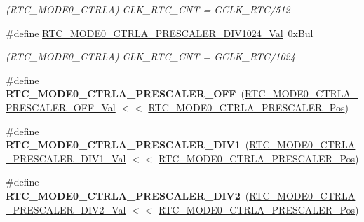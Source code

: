 \begin{DoxyCompactItemize}
\begin{DoxyCompactList}\small\item\em (R\+T\+C\+\_\+\+M\+O\+D\+E0\+\_\+\+C\+T\+R\+L\+A) C\+L\+K\+\_\+\+R\+T\+C\+\_\+\+C\+N\+T = G\+C\+L\+K\+\_\+\+R\+T\+C/512 \end{DoxyCompactList}\item 
\hypertarget{group___s_a_m_l21___r_t_c_ga831f9eaa76aec5a525d35687ba24bb89}{}\#define \hyperlink{group___s_a_m_l21___r_t_c_ga831f9eaa76aec5a525d35687ba24bb89}{R\+T\+C\+\_\+\+M\+O\+D\+E0\+\_\+\+C\+T\+R\+L\+A\+\_\+\+P\+R\+E\+S\+C\+A\+L\+E\+R\+\_\+\+D\+I\+V1024\+\_\+\+Val}~0x\+Bul\label{group___s_a_m_l21___r_t_c_ga831f9eaa76aec5a525d35687ba24bb89}

\begin{DoxyCompactList}\small\item\em (R\+T\+C\+\_\+\+M\+O\+D\+E0\+\_\+\+C\+T\+R\+L\+A) C\+L\+K\+\_\+\+R\+T\+C\+\_\+\+C\+N\+T = G\+C\+L\+K\+\_\+\+R\+T\+C/1024 \end{DoxyCompactList}\item 
\hypertarget{group___s_a_m_l21___r_t_c_gadb0491c6a31b8d45e3aa494995560813}{}\#define {\bfseries R\+T\+C\+\_\+\+M\+O\+D\+E0\+\_\+\+C\+T\+R\+L\+A\+\_\+\+P\+R\+E\+S\+C\+A\+L\+E\+R\+\_\+\+O\+F\+F}~(\hyperlink{group___s_a_m_l21___r_t_c_ga8d252b01683e5440e71ea8520409e234}{R\+T\+C\+\_\+\+M\+O\+D\+E0\+\_\+\+C\+T\+R\+L\+A\+\_\+\+P\+R\+E\+S\+C\+A\+L\+E\+R\+\_\+\+O\+F\+F\+\_\+\+Val} $<$$<$ \hyperlink{group___s_a_m_l21___r_t_c_ga0dbb76324e6c9c6d9391c96723e6e59b}{R\+T\+C\+\_\+\+M\+O\+D\+E0\+\_\+\+C\+T\+R\+L\+A\+\_\+\+P\+R\+E\+S\+C\+A\+L\+E\+R\+\_\+\+Pos})\label{group___s_a_m_l21___r_t_c_gadb0491c6a31b8d45e3aa494995560813}

\item 
\hypertarget{group___s_a_m_l21___r_t_c_gaface5f0960eb755bb01cbee0cd12a812}{}\#define {\bfseries R\+T\+C\+\_\+\+M\+O\+D\+E0\+\_\+\+C\+T\+R\+L\+A\+\_\+\+P\+R\+E\+S\+C\+A\+L\+E\+R\+\_\+\+D\+I\+V1}~(\hyperlink{group___s_a_m_l21___r_t_c_ga3368a55d0baa545619ccb1a6f1a0843a}{R\+T\+C\+\_\+\+M\+O\+D\+E0\+\_\+\+C\+T\+R\+L\+A\+\_\+\+P\+R\+E\+S\+C\+A\+L\+E\+R\+\_\+\+D\+I\+V1\+\_\+\+Val} $<$$<$ \hyperlink{group___s_a_m_l21___r_t_c_ga0dbb76324e6c9c6d9391c96723e6e59b}{R\+T\+C\+\_\+\+M\+O\+D\+E0\+\_\+\+C\+T\+R\+L\+A\+\_\+\+P\+R\+E\+S\+C\+A\+L\+E\+R\+\_\+\+Pos})\label{group___s_a_m_l21___r_t_c_gaface5f0960eb755bb01cbee0cd12a812}

\item 
\hypertarget{group___s_a_m_l21___r_t_c_ga993233478b1d65afaf5d1bf70bace8ba}{}\#define {\bfseries R\+T\+C\+\_\+\+M\+O\+D\+E0\+\_\+\+C\+T\+R\+L\+A\+\_\+\+P\+R\+E\+S\+C\+A\+L\+E\+R\+\_\+\+D\+I\+V2}~(\hyperlink{group___s_a_m_l21___r_t_c_ga114db7ddc2d209f1f98a13f185dcc0eb}{R\+T\+C\+\_\+\+M\+O\+D\+E0\+\_\+\+C\+T\+R\+L\+A\+\_\+\+P\+R\+E\+S\+C\+A\+L\+E\+R\+\_\+\+D\+I\+V2\+\_\+\+Val} $<$$<$ \hyperlink{group___s_a_m_l21___r_t_c_ga0dbb76324e6c9c6d9391c96723e6e59b}{R\+T\+C\+\_\+\+M\+O\+D\+E0\+\_\+\+C\+T\+R\+L\+A\+\_\+\+P\+R\+E\+S\+C\+A\+L\+E\+R\+\_\+\+Pos})\label{group___s_a_m_l21___r_t_c_ga993233478b1d65afaf5d1bf70bace8ba}


\end{DoxyCompactItemize}
